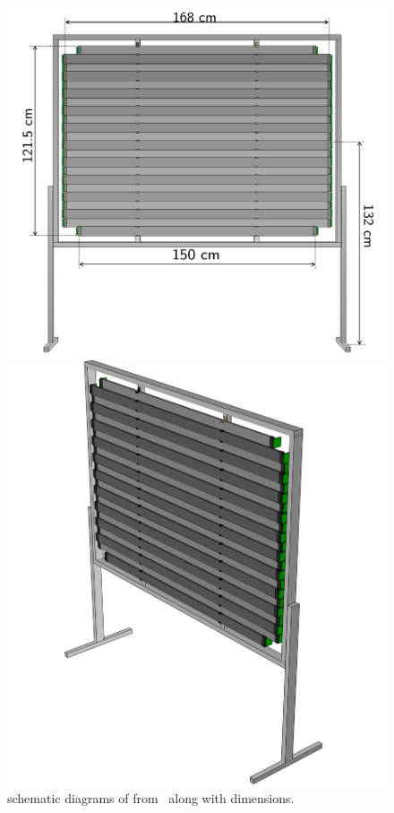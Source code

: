\begin{figure}[h]
  \begin{minipage}[t]{.6\linewidth}
    \includegraphics[width=\linewidth]{files/figures/hptpc_beam_flux/uToF_sketch}
  \end{minipage}
  \hfill
  \begin{minipage}[t]{.35\linewidth}
    \includegraphics[width=\linewidth]{files/figures/hptpc_beam_flux/uTOF_rot}
  \end{minipage}
  \caption[Schematic diagrams of \SThree]{\SThree schematic diagrams of \SThree from~\cite{s3Paper} along with dimensions.}
  \label{fig:s3Diag}
\end{figure}


